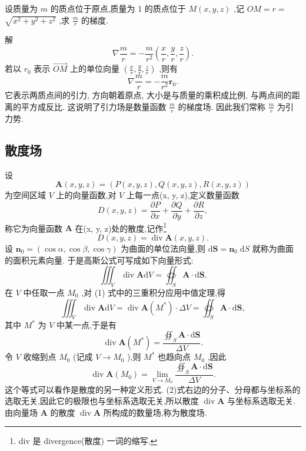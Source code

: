 \begin{example}

\end{example}
设质量为 \(m\) 的质点位于原点,质量为 1 的质点位于 \(M\left( {x,y,z}\right)\) ,记 \({OM} = r =\)  \(\sqrt{{x}^{2} + {y}^{2} + {z}^{2}}\) ,求 \(\frac{m}{r}\) 的梯度.

解
\[
\nabla \frac{m}{r} =  - \frac{m}{{r}^{2}}\left( {\frac{x}{r},\frac{y}{r},\frac{z}{r}}\right) .
\]
若以 \({r}_{0}\) 表示 \(\overrightarrow{OM}\) 上的单位向量 \(\left( {\frac{x}{r},\frac{y}{r},\frac{z}{r}}\right)\) ,则有
\[
\nabla \frac{m}{r} =  - \frac{m}{{r}^{2}}{\mathbf{r}}_{0}.
\]
它表示两质点间的引力, 方向朝着原点, 大小是与质量的乘积成比例, 与两点间的距离的平方成反比. 这说明了引力场是数量函数 \(\frac{m}{r}\) 的梯度场. 因此我们常称 \(\frac{m}{r}\) 为引力势.



\subsection{散度场}

设
\[
\mathbf{A}\left( {x,y,z}\right)  = \left( {P\left( {x,y,z}\right) ,Q\left( {x,y,z}\right) ,R\left( {x,y,z}\right) }\right)
\]
为空间区域 \(V\) 上的向量函数,对 \(V\) 上每一点(x, y, z),定义数量函数
\[
D\left( {x,y,z}\right)  = \frac{\partial P}{\partial x} + \frac{\partial Q}{\partial y} + \frac{\partial R}{\partial z},
\]
称它为向量函数 \(\mathbf{A}\) 在(x, y, z)处的散度,记作\footnote{div 是 divergence(散度) 一词的缩写.}
\[
D\left( {x,y,z}\right)  = \operatorname{div}\mathbf{A}{\left( x,y,z\right) }.
\]
设 \({\mathbf{n}}_{0} = \left( {\cos \alpha ,\cos \beta ,\cos \gamma }\right)\) 为曲面的单位法向量,则 \(\mathrm{d}\mathbf{S} = {\mathbf{n}}_{0}\mathrm{\;d}S\) 就称为曲面的面积元素向量. 于是高斯公式可写成如下向量形式:
\[
{\iiint }_{V}\operatorname{div}\mathbf{A}\mathrm{d}V = {\oiint }_{S}\mathbf{A} \cdot  \mathrm{d}\mathbf{S}. \tag{1}
\]
在 \(V\) 中任取一点 \({M}_{0}\) ,对 (1) 式中的三重积分应用中值定理,得
\[
{\iiint }_{V}\operatorname{div}\mathbf{A}\mathrm{d}V = \operatorname{div}\mathbf{A}\left( {M}^{ * }\right)  \cdot  {\Delta V} = {\oiint }_{S}\mathbf{A} \cdot  \mathrm{d}\mathbf{S},
\]
其中 \({M}^{ * }\) 为 \(V\) 中某一点,于是有
\[
\operatorname{div}\mathbf{A}\left( {M}^{ * }\right)  = \frac{{\oiint }_{S}\mathbf{A} \cdot  \mathrm{d}\mathbf{S}}{\Delta V}.
\]
令 \(V\) 收缩到点 \({M}_{0}\) (记成 \(V \rightarrow  {M}_{0}\) ),则 \({M}^{ * }\) 也趋向点 \({M}_{0}\) ,因此
\[
\operatorname{div}\mathbf{A}\left( {M}_{0}\right)  = \mathop{\lim }\limits_{{V \rightarrow  {M}_{0}}}\frac{{\oiint }_{S}\mathbf{A} \cdot  \mathrm{d}\mathbf{S}}{\Delta V}. \tag{2}
\]
这个等式可以看作是散度的另一种定义形式. (2)式右边的分子、分母都与坐标系的选取无关,因此它的极限也与坐标系选取无关,所以散度 \(\operatorname{div}\mathbf{A}\) 与坐标系选取无关. 由向量场 \(\mathbf{A}\) 的散度 \(\operatorname{div}\mathbf{A}\) 所构成的数量场,称为散度场.

